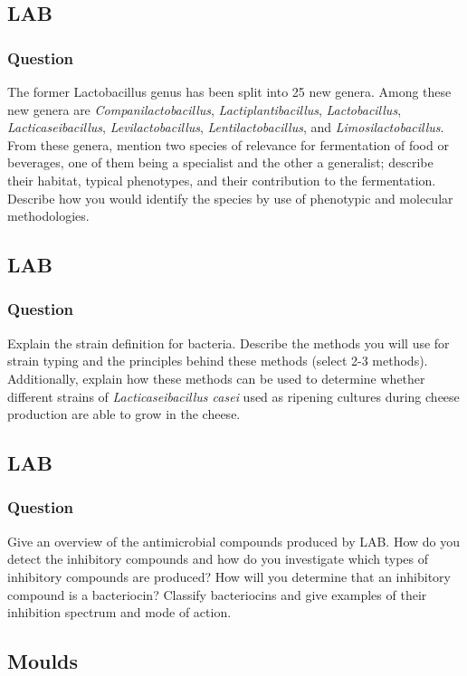 \subsection{LAB}
\subsubsection*{Question}
The former Lactobacillus genus has been split into 25 new genera. Among these new genera are \textit{Companilactobacillus}, \textit{Lactiplantibacillus}, \textit{Lactobacillus}, \textit{Lacticaseibacillus}, \textit{Levilactobacillus}, \textit{Lentilactobacillus}, and \textit{Limosilactobacillus}. From these genera, mention two species of relevance for fermentation of food or beverages, one of them being a specialist and the other a generalist; describe their habitat, typical phenotypes, and their contribution to the fermentation. Describe how you would identify the species by use of phenotypic and molecular methodologies.

\subsection{LAB}
\subsubsection*{Question}
Explain the strain definition for bacteria. Describe the methods you will use for strain typing and the principles behind these methods (select 2-3 methods). Additionally, explain how these methods can be used to determine whether different strains of \textit{Lacticaseibacillus casei} used as ripening cultures during cheese production are able to grow in the cheese.

\subsection{LAB}
\subsubsection*{Question}
Give an overview of the antimicrobial compounds produced by LAB. How do you detect the inhibitory compounds and how do you investigate which types of inhibitory compounds are produced? How will you determine that an inhibitory compound is a bacteriocin? Classify bacteriocins and give examples of their inhibition spectrum and mode of action. 

\subsection{Moulds}
